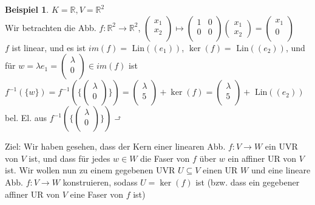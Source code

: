 \documentclass[10pt,a4paper,numbers=endperiod]{scrartcl}
\theoremstyle{definition}
\newtheorem{bsp}[satz]{Beispiel}
\def\RR{{\mathbb R}}
\begin{document}
\begin{bsp}
	$K = \RR, V= \RR^2$\\
	Wir betrachten die Abb. $f: \RR^2 \rightarrow \RR^2$, $\begin{pmatrix}
	x_1\\x_2\\
	\end{pmatrix} \mapsto \begin{pmatrix}
	1&0\\0&0\\
	\end{pmatrix} \begin{pmatrix}
	x_1\\x_2
	\end{pmatrix}= \begin{pmatrix}
	x_1\\ 0\\
	\end{pmatrix}$\\
	$f$ ist linear, und es ist $im(f) = \text{ Lin}((e_1))$, $\ker(f)= \text{ Lin}((e_2))$, und für $w= \lambda e_1 = \begin{pmatrix}
	\lambda\\0\\
	\end{pmatrix} \in im(f)$ ist $f^{-1}(\{w\})= f^{-1}(\{\begin{pmatrix}
	\lambda\\0\\
	\end{pmatrix}\}) = \begin{pmatrix}
	\lambda\\5\\
	\end{pmatrix} + \ker (f) = \begin{pmatrix}
	\lambda\\5\\
	\end{pmatrix}+ \text{ Lin}((e_2))$\\
	\hspace*{32,2 mm}bel. El. aus $f^{-1}(\{ \begin{pmatrix}
	\lambda\\0\\
	\end{pmatrix}\})$ $\rotatebox[origin=c]{270}{$\Lsh$}$
\end{bsp}

Ziel: Wir haben gesehen, dass der Kern einer linearen Abb. $f:V \rightarrow W$ ein UVR von $V$ ist, und dass für jedes $w \in W$ die Faser von $f$ über $w$ ein affiner UR von $V$ ist. Wir wollen nun zu einem gegebenen UVR $U \subseteq V$ einen UR $W$ und eine lineare Abb. $f:V \rightarrow W$ konstruieren, sodass $U = \ker(f)$ ist (bzw. dass ein gegebener affiner UR von $V$ eine Faser von $f$ ist)
\end{document}
